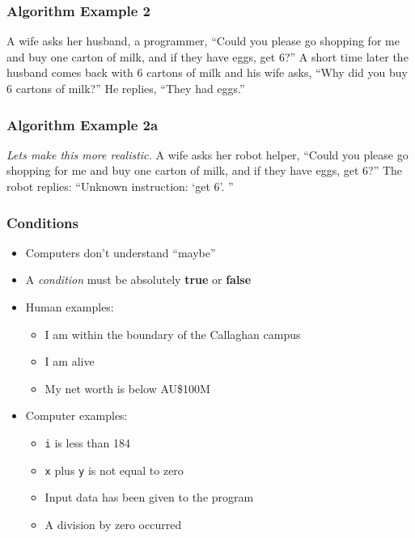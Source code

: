 \documentclass[14pt]{beamer}
\begin{document}
\begin{frame}
\frametitle{Algorithm Example 2}
A wife asks her husband, a programmer, ``Could you please go shopping for me and buy one carton of milk, and if they have eggs, get 6?”
\linebreak \linebreak
A short time later the husband comes back with 6 cartons of milk and his wife asks, ``Why did you buy 6 cartons of milk?”
\linebreak \linebreak
He replies, “They had eggs.”
\end{frame}

\begin{frame}
\frametitle{Algorithm Example 2a}
\textit{Lets make this more realistic.}
\linebreak \linebreak
A wife asks her robot helper, ``Could you please go shopping for me and buy one carton of milk, and if they have eggs, get 6?”
\linebreak \linebreak
The robot replies: ``Unknown instruction: `get 6'. ''
\end{frame}

\begin{frame}
\frametitle{Conditions}
\begin{itemize}
\item Computers don't understand ``maybe''
\item A \textit{condition} must be absolutely \textbf{true} or \textbf{false}
\item Human examples:
	\begin{itemize}
		\item I am within the boundary of the Callaghan campus
		\item I am alive
		\item My net worth is below AU\$100M
	\end{itemize}
\item Computer examples:
	\begin{itemize}
		\item \texttt{i} is less than 184
		\item \texttt{x} plus \texttt{y} is not equal to zero
		\item Input data has been given to the program
		\item A division by zero occurred
	\end{itemize}
\end{itemize}
\end{frame}
\end{document}
